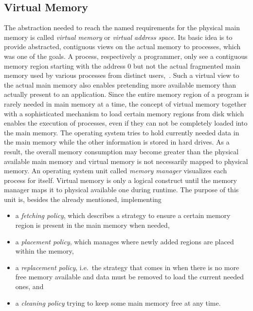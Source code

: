 \subsection{Virtual Memory}
The abstraction needed to reach the named requirements for the physical main memory is called \textit{virtual memory} or \textit{virtual address space}.
Its basic idea is to provide abstracted, contiguous views on the actual memory to processes, which was one of the goals.
A process, respectively a programmer, only see a contiguous memory region starting with the address 0 but not the actual fragmented main memory used by various processes from distinct users\cite{mandl2014Grundkurs},~\cite{brause2017betriebssysteme}.
Such a virtual view to the actual main memory also enables pretending more available memory than actually present to an application.
Since the entire memory region of a program is rarely needed in main memory at a time, the concept of virtual memory together with a sophisticated mechanism to load certain memory regions from disk which enables the execution of processes, even if they can not be completely loaded into the main memory.
The operating system tries to hold currently needed data in the main memory while the other information is stored in hard drives.
As a result, the overall memory consumption may become greater than the physical available main memory and virtual memory is not necessarily mapped to physical memory\cite{mandl2014Grundkurs}.
An operating system unit called \textit{memory manager} visualizes each process for itself.
Virtual memory is only a logical construct until the memory manager maps it to physical available one during runtime.
The purpose of this unit is, besides the already mentioned, implementing
\begin{itemize}
    \item a \textit{fetching policy}, which describes a strategy to ensure a certain memory region is present in the main memory when needed,
    \item a \textit{placement policy}, which manages where newly added regions are placed within the memory,
    \item a \textit{replacement policy}, i.e.\ the strategy that comes in when there is no more free memory available and data must be removed to load the current needed ones, and
    \item a \textit{cleaning policy} trying to keep some main memory free at any time\cite{mandl2014Grundkurs}.
\end{itemize}
